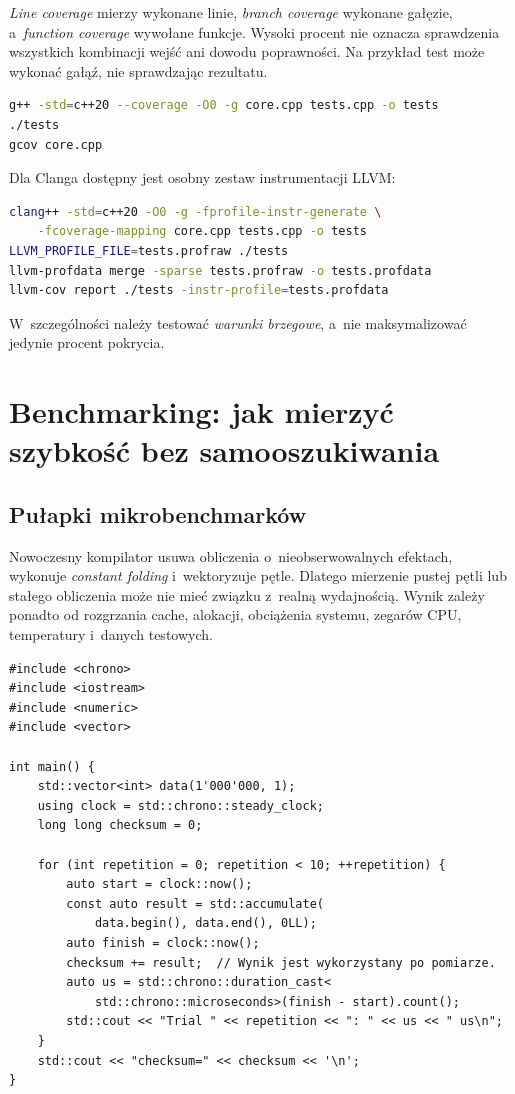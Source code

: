 \emph{Line coverage} mierzy wykonane linie, \emph{branch coverage}
wykonane gałęzie, a~\emph{function coverage} wywołane funkcje.
Wysoki procent nie oznacza sprawdzenia wszystkich kombinacji wejść
ani dowodu poprawności. Na przykład test może wykonać gałąź, nie
sprawdzając rezultatu.

\begin{lstlisting}[language=bash,caption={Pokrycie testow z GCC i gcov (przykladowy projekt).}]
g++ -std=c++20 --coverage -O0 -g core.cpp tests.cpp -o tests
./tests
gcov core.cpp
\end{lstlisting}

Dla Clanga dostępny jest osobny zestaw instrumentacji LLVM:
\begin{lstlisting}[language=bash,caption={Clang: instrumentacja i raport pokrycia.}]
clang++ -std=c++20 -O0 -g -fprofile-instr-generate \
    -fcoverage-mapping core.cpp tests.cpp -o tests
LLVM_PROFILE_FILE=tests.profraw ./tests
llvm-profdata merge -sparse tests.profraw -o tests.profdata
llvm-cov report ./tests -instr-profile=tests.profdata
\end{lstlisting}

W~szczególności należy testować \emph{warunki brzegowe}, a~nie
maksymalizować jedynie procent pokrycia.

\section{Benchmarking: jak mierzyć szybkość bez samooszukiwania}
\label{sec:cpp18-benchmark}

\subsection{Pułapki mikrobenchmarków}

Nowoczesny kompilator usuwa obliczenia o~nieobserwowalnych efektach,
wykonuje \emph{constant folding} i~wektoryzuje pętle. Dlatego mierzenie
pustej pętli lub stałego obliczenia może nie mieć związku z~realną
wydajnością. Wynik zależy ponadto od rozgrzania cache, alokacji,
obciążenia systemu, zegarów CPU, temperatury i~danych testowych.

\begin{lstlisting}[caption={Pomiar algorytmu z rzeczywistym wynikiem (bez biblioteki benchmark).}]
#include <chrono>
#include <iostream>
#include <numeric>
#include <vector>

int main() {
    std::vector<int> data(1'000'000, 1);
    using clock = std::chrono::steady_clock;
    long long checksum = 0;

    for (int repetition = 0; repetition < 10; ++repetition) {
        auto start = clock::now();
        const auto result = std::accumulate(
            data.begin(), data.end(), 0LL);
        auto finish = clock::now();
        checksum += result;  // Wynik jest wykorzystany po pomiarze.
        auto us = std::chrono::duration_cast<
            std::chrono::microseconds>(finish - start).count();
        std::cout << "Trial " << repetition << ": " << us << " us\n";
    }
    std::cout << "checksum=" << checksum << '\n';
}
\end{lstlisting}

